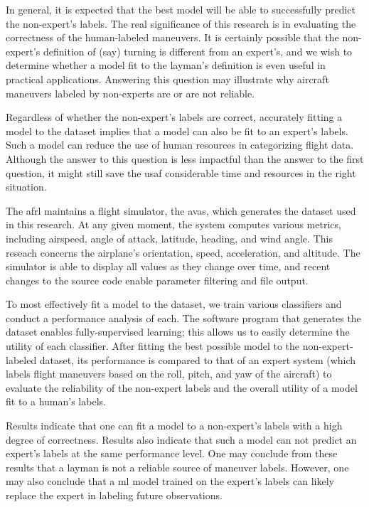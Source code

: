 \documentclass[../main.tex]{subfiles}
\begin{document}

In general, it is expected that the best model will be able to successfully predict the non-expert's labels. The real significance of this research is in evaluating the correctness of the human-labeled maneuvers. It is certainly possible that the non-expert's definition of (say) turning is different from an expert's, and we wish to determine whether a model fit to the layman's definition is even useful in practical applications. Answering this question may illustrate why aircraft maneuvers labeled by non-experts are or are not reliable.

Regardless of whether the non-expert's labels are correct, accurately fitting a model to the dataset implies that a model can also be fit to an expert's labels. Such a model can reduce the use of human resources in categorizing flight data. Although the answer to this question is less impactful than the answer to the first question, it might still save the \ac{usaf} considerable time and resources in the right situation.


The \ac{afrl} maintains a flight simulator, the \ac{avas}, which generates the dataset used in this research. At any given moment, the system computes various metrics, including airspeed, angle of attack, latitude, heading, and wind angle. This reseach concerns the airplane's orientation, speed, acceleration, and altitude. The simulator is able to display all values as they change over time, and recent changes to the source code enable parameter filtering and file output.


To most effectively fit a model to the dataset, we train various classifiers and conduct a performance analysis of each. The software program that generates the dataset enables fully-supervised learning; this allows us to easily determine the utility of each classifier. After fitting the best possible model to the non-expert-labeled dataset, its performance is compared to that of an expert system (which labels flight maneuvers based on the roll, pitch, and yaw of the aircraft) to evaluate the reliability of the non-expert labels and the overall utility of a model fit to a human's labels.


Results indicate that one can fit a model to a non-expert's labels with a high degree of correctness. Results also indicate that such a model can not predict an expert's labels at the same performance level. One may conclude from these results that a layman is not a reliable source of maneuver labels. However, one may also conclude that a \acl{ml} model trained on the expert's labels can likely replace the expert in labeling future observations.
\end{document}
